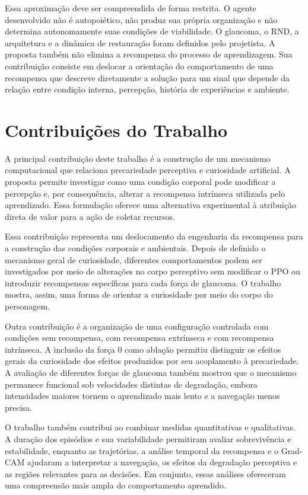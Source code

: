 Essa aproximação deve ser compreendida de forma restrita. O agente desenvolvido não é autopoiético, não produz sua própria organização e não determina autonomamente suas condições de viabilidade. O glaucoma, o RND, a arquitetura e a dinâmica de restauração foram definidos pelo projetista. A proposta também não elimina a recompensa do processo de aprendizagem. Sua contribuição consiste em deslocar a orientação do comportamento de uma recompensa que descreve diretamente a solução para um sinal que depende da relação entre condição interna, percepção, história de experiências e ambiente.

\section{Contribuições do Trabalho}
\label{sec:contribuicoes-do-trabalho}

A principal contribuição deste trabalho é a construção de um mecanismo computacional que relaciona precariedade perceptiva e curiosidade artificial. A proposta permite investigar como uma condição corporal pode modificar a percepção e, por consequência, alterar a recompensa intrínseca utilizada pelo aprendizado. Essa formulação oferece uma alternativa experimental à atribuição direta de valor para a ação de coletar recursos.

Essa contribuição representa um deslocamento da engenharia da recompensa para a construção das condições corporais e ambientais. Depois de definido o mecanismo geral de curiosidade, diferentes comportamentos podem ser investigados por meio de alterações no corpo perceptivo sem modificar o PPO ou introduzir recompensas específicas para cada força de glaucoma. O trabalho mostra, assim, uma forma de orientar a curiosidade por meio do corpo do personagem.

Outra contribuição é a organização de uma configuração controlada com condições sem recompensa, com recompensa extrínseca e com recompensa intrínseca. A inclusão da força $0$ como ablação permitiu distinguir os efeitos gerais da curiosidade dos efeitos produzidos por seu acoplamento à precariedade. A avaliação de diferentes forças de glaucoma também mostrou que o mecanismo permanece funcional sob velocidades distintas de degradação, embora intensidades maiores tornem o aprendizado mais lento e a navegação menos precisa.

O trabalho também contribui ao combinar medidas quantitativas e qualitativas. A duração dos episódios e sua variabilidade permitiram avaliar sobrevivência e estabilidade, enquanto as trajetórias, a análise temporal da recompensa e o Grad-CAM ajudaram a interpretar a navegação, os efeitos da degradação perceptiva e as regiões relevantes para as decisões. Em conjunto, essas análises ofereceram uma compreensão mais ampla do comportamento aprendido.

